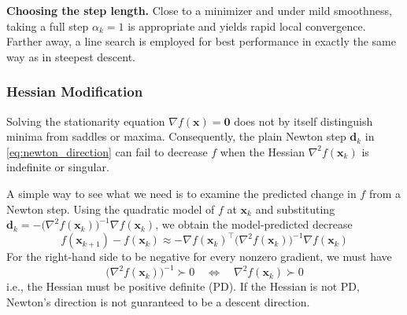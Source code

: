 \textbf{Choosing the step length.}\quad
Close to a minimizer and under mild smoothness, taking a full step $\alpha_k=1$ is appropriate and yields rapid local convergence. Farther away, a line search is employed for best performance in exactly the same way as in steepest descent.

\subsubsection{Hessian Modification}
Solving the stationarity equation $\nabla f(\mathbf{x})=\mathbf{0}$ does not by itself distinguish minima from saddles or maxima. Consequently, the plain Newton step $\mathbf{d}_k$ in \eqref{eq:newton_direction} can fail to decrease $f$ when the Hessian $\nabla^2 f(\mathbf{x}_k)$ is indefinite or singular.

A simple way to see what we need is to examine the predicted change in $f$ from a Newton step. Using the quadratic model of $f$ at $\mathbf{x}_k$ and substituting $\mathbf{d}_k=-\big(\nabla^2 f(\mathbf{x}_k)\big)^{-1}\nabla f(\mathbf{x}_k)$, we obtain the model-predicted decrease
\begin{equation}
f(\mathbf{x}_{k+1})-f(\mathbf{x}_k)
\approx
-\nabla f(\mathbf{x}_k)^\top
\big(\nabla^2 f(\mathbf{x}_k)\big)^{-1}
\nabla f(\mathbf{x}_k)
\end{equation}
For the right-hand side to be negative for every nonzero gradient, we must have
\begin{equation}
\big(\nabla^2 f(\mathbf{x}_k)\big)^{-1} \succ 0 
\quad\iff\quad 
\nabla^2 f(\mathbf{x}_k)\succ 0
\end{equation}
i.e., the Hessian must be positive definite (PD). If the Hessian is not PD, Newton's direction is not guaranteed to be a descent direction.

